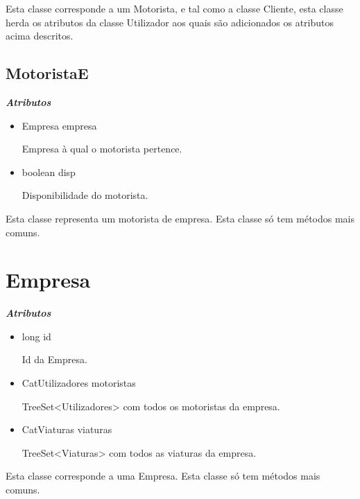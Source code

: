 \documentclass[12pt,a4paper]{report}
\begin{document}
Esta classe corresponde a um Motorista, e tal como a classe Cliente, esta classe herda os atributos da classe Utilizador aos quais são adicionados os atributos acima descritos.

\subsection{MotoristaE}
\emph{\bfseries Atributos}
\begin{itemize}
    \item Empresa empresa \par
Empresa à qual o motorista pertence.
    \item boolean disp \par
Disponibilidade do motorista.
\end{itemize}

Esta classe representa um motorista de empresa. Esta classe só tem métodos mais comuns.

\section{Empresa}
\emph{\bfseries Atributos}
\begin{itemize}
    \item long id \par
Id da Empresa.
    \item CatUtilizadores motoristas \par
TreeSet<Utilizadores> com todos os motoristas da empresa.
    \item  CatViaturas viaturas \par
TreeSet<Viaturas> com todos as viaturas da empresa.
\end{itemize}
Esta classe corresponde a uma Empresa. Esta classe só tem métodos mais comuns.
\end{document}
